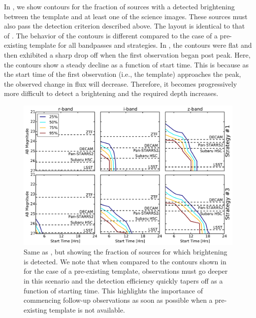 In , we show contours for the fraction of sources with a detected brightening between the template and at least one of the science images. These sources must also pass the detection criterion described above. The layout is identical to that of . The behavior of the contours is different compared to the case of a pre-existing template for all bandpasses and strategies. In , the contours were flat and then exhibited a sharp drop off when the first observation began post peak. Here, the contours show a steady decline as a function of start time. This is because as the start time of the first observation (i.e., the template) approaches the peak, the observed change in flux will decrease. Therefore, it becomes progressively more difficult to detect a brightening and the required depth increases.

\begin{figure}[t!]
\centering
\includegraphics[width=\textwidth]{./figs/chapter2/f13.pdf}
\caption{\singlespace Same as , but showing the fraction of sources for which brightening is detected. We note that when compared to the contours shown in  for the case of a pre-existing template, observations must go deeper in this scenario and the detection efficiency quickly tapers off as a function of starting time. This highlights the importance of commencing follow-up observations as soon as possible when a pre-existing template is not available.}
\label{fig:ch2_risediff}
\end{figure}

